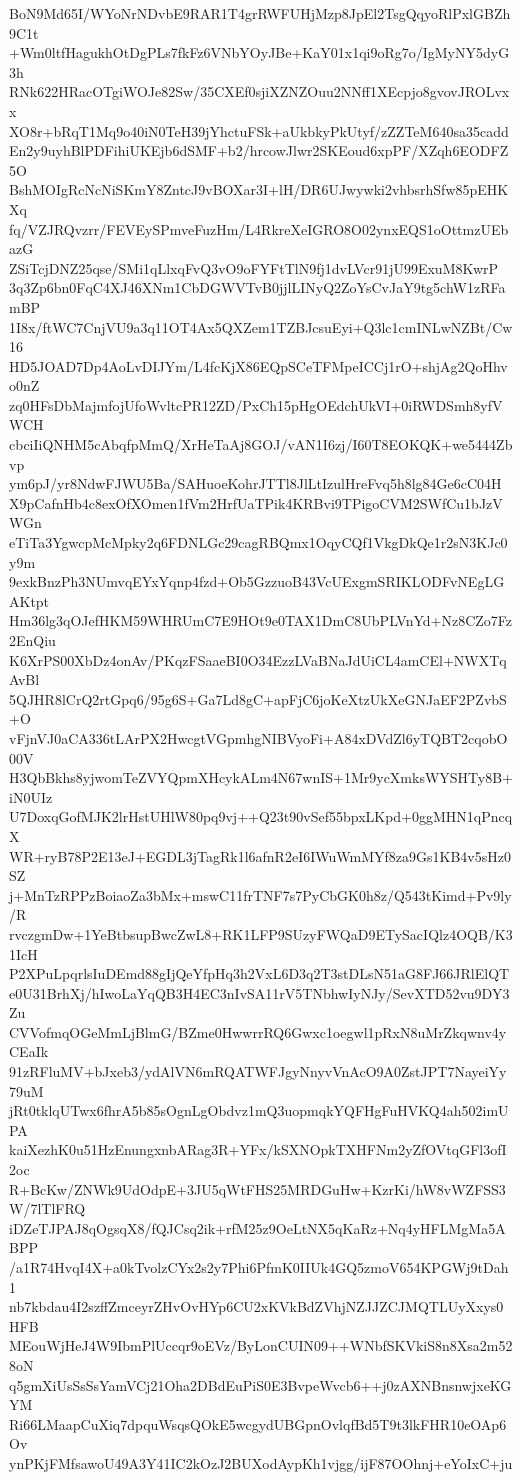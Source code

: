 BoN9Md65I/WYoNrNDvbE9RAR1T4grRWFUHjMzp8JpEl2TsgQqyoRlPxlGBZh9C1t
+Wm0ltfHagukhOtDgPLs7fkFz6VNbYOyJBe+KaY01x1qi9oRg7o/IgMyNY5dyG3h
RNk622HRacOTgiWOJe82Sw/35CXEf0sjiXZNZOuu2NNff1XEcpjo8gvovJROLvxx
XO8r+bRqT1Mq9o40iN0TeH39jYhctuFSk+aUkbkyPkUtyf/zZZTeM640sa35cadd
En2y9uyhBlPDFihiUKEjb6dSMF+b2/hrcowJlwr2SKEoud6xpPF/XZqh6EODFZ5O
BshMOIgRcNcNiSKmY8ZntcJ9vBOXar3I+lH/DR6UJwywki2vhbsrhSfw85pEHKXq
fq/VZJRQvzrr/FEVEySPmveFuzHm/L4RkreXeIGRO8O02ynxEQS1oOttmzUEbazG
ZSiTcjDNZ25qse/SMi1qLlxqFvQ3vO9oFYFtTlN9fj1dvLVcr91jU99ExuM8KwrP
3q3Zp6bn0FqC4XJ46XNm1CbDGWVTvB0jjlLINyQ2ZoYsCvJaY9tg5chW1zRFamBP
1I8x/ftWC7CnjVU9a3q11OT4Ax5QXZem1TZBJcsuEyi+Q3lc1cmINLwNZBt/Cw16
HD5JOAD7Dp4AoLvDIJYm/L4fcKjX86EQpSCeTFMpeICCj1rO+shjAg2QoHhvo0nZ
zq0HFsDbMajmfojUfoWvltcPR12ZD/PxCh15pHgOEdchUkVI+0iRWDSmh8yfVWCH
cbciIiQNHM5cAbqfpMmQ/XrHeTaAj8GOJ/vAN1I6zj/I60T8EOKQK+we5444Zbvp
ym6pJ/yr8NdwFJWU5Ba/SAHuoeKohrJTTl8JlLtIzulHreFvq5h8lg84Ge6cC04H
X9pCafnHb4c8exOfXOmen1fVm2HrfUaTPik4KRBvi9TPigoCVM2SWfCu1bJzVWGn
eTiTa3YgwcpMcMpky2q6FDNLGc29cagRBQmx1OqyCQf1VkgDkQe1r2sN3KJc0y9m
9exkBnzPh3NUmvqEYxYqnp4fzd+Ob5GzzuoB43VcUExgmSRIKLODFvNEgLGAKtpt
Hm36lg3qOJefHKM59WHRUmC7E9HOt9e0TAX1DmC8UbPLVnYd+Nz8CZo7Fz2EnQiu
K6XrPS00XbDz4onAv/PKqzFSaaeBI0O34EzzLVaBNaJdUiCL4amCEl+NWXTqAvBl
5QJHR8lCrQ2rtGpq6/95g6S+Ga7Ld8gC+apFjC6joKeXtzUkXeGNJaEF2PZvbS+O
vFjnVJ0aCA336tLArPX2HwcgtVGpmhgNIBVyoFi+A84xDVdZl6yTQBT2cqobO00V
H3QbBkhs8yjwomTeZVYQpmXHcykALm4N67wnIS+1Mr9ycXmksWYSHTy8B+iN0UIz
U7DoxqGofMJK2lrHstUHlW80pq9vj++Q23t90vSef55bpxLKpd+0ggMHN1qPncqX
WR+ryB78P2E13eJ+EGDL3jTagRk1l6afnR2eI6IWuWmMYf8za9Gs1KB4v5sHz0SZ
j+MnTzRPPzBoiaoZa3bMx+mswC11frTNF7s7PyCbGK0h8z/Q543tKimd+Pv9ly/R
rvczgmDw+1YeBtbsupBwcZwL8+RK1LFP9SUzyFWQaD9ETySacIQlz4OQB/K31IcH
P2XPuLpqrlsIuDEmd88gIjQeYfpHq3h2VxL6D3q2T3stDLsN51aG8FJ66JRlElQT
e0U31BrhXj/hIwoLaYqQB3H4EC3nIvSA11rV5TNbhwIyNJy/SevXTD52vu9DY3Zu
CVVofmqOGeMmLjBlmG/BZme0HwwrrRQ6Gwxc1oegwl1pRxN8uMrZkqwnv4yCEaIk
91zRFluMV+bJxeb3/ydAlVN6mRQATWFJgyNnyvVnAcO9A0ZstJPT7NayeiYy79uM
jRt0tklqUTwx6fhrA5b85sOgnLgObdvz1mQ3uopmqkYQFHgFuHVKQ4ah502imUPA
kaiXezhK0u51HzEnungxnbARag3R+YFx/kSXNOpkTXHFNm2yZfOVtqGFl3ofI2oc
R+BcKw/ZNWk9UdOdpE+3JU5qWtFHS25MRDGuHw+KzrKi/hW8vWZFSS3W/7lTlFRQ
iDZeTJPAJ8qOgsqX8/fQJCsq2ik+rfM25z9OeLtNX5qKaRz+Nq4yHFLMgMa5ABPP
/a1R74HvqI4X+a0kTvolzCYx2s2y7Phi6PfmK0IIUk4GQ5zmoV654KPGWj9tDah1
nb7kbdau4I2szffZmceyrZHvOvHYp6CU2xKVkBdZVhjNZJJZCJMQTLUyXxys0HFB
MEouWjHeJ4W9IbmPlUccqr9oEVz/ByLonCUIN09++WNbfSKVkiS8n8Xsa2m528oN
q5gmXiUsSsSsYamVCj21Oha2DBdEuPiS0E3BvpeWvcb6++j0zAXNBnsnwjxeKGYM
Ri66LMaapCuXiq7dpquWsqsQOkE5wcgydUBGpnOvlqfBd5T9t3lkFHR10eOAp6Ov
ynPKjFMfsawoU49A3Y41IC2kOzJ2BUXodAypKh1vjgg/ijF87OOhnj+eYoIxC+ju

